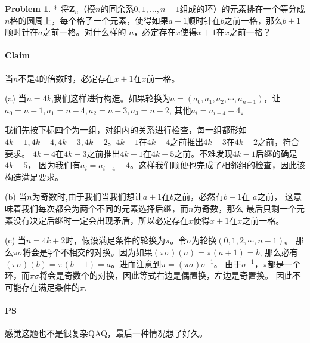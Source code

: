 \documentclass[UTF8]{ctexart}
\theoremstyle{definition}
\newtheorem{problem}{Problem}
\begin{document}
\begin{problem} *
将$\mathbf{Z}_n$（模$n$的同余系$0, 1, \dots, n-1$组成的环）的元素排在一个等分成$n$格的圆周上，每个格子一个元素，使得如果$a+1$顺时针在$b$之前一格，那么$b+1$顺时针在$a$之前一格。对什么样的
$n$，必定存在$x$使得$x+1$在$x$之前一格？

\paragraph{Claim} 当$n$不是4的倍数时，必定存在$x+1$在$x$前一格。

(a) 当$n=4k$,我们这样进行构造。如果轮换为$a=(a_0, a_1, a_2, \cdots, a_{n-1})$，让
$a_0=n-1, a_1 = n-4, a_2 = n-3, a_3=n-2$, 其他$a_i = a_{i-4} - 4$。

我们先按下标四个为一组，对组内的关系进行检查，每一组都形如
$4k-1,4k-4,4k-3,4k-2$。$4k-1$在$4k-4$之前推出$4k-3$在$4k-2$之前，符合要求。
$4k-4$在$4k-3$之前推出$4k-1$在$4k-5$之前。不难发现$4k-1$后继的确是$4k-5$，
因为我们有$a_i = a_{i-4} - 4$。这样我们顺便也完成了相邻组的检查，因此该构造满足要求。

(b) 当$n$为奇数时,由于我们当我们想让$a+1$在$b$之前，必然有$b+1$在
$a$之前， 这意味着我们每次都会为两个不同的元素选择后继，而$n$为奇数，那么
最后只剩一个元素没有决定后继时一定会出现矛盾，所以必定存在$x$使得$x+1$在$x$之前一格。

(c) 当$n=4k+2$时，假设满足条件的轮换为$\pi$。令$\sigma$为轮换$(0,1,2,\cdots,n-1)$。
那么$\pi\sigma$将会是$\frac n 2$个不相交的对换。因为如果$(\pi\sigma)(a)=\pi(a+1)=b$,
那么必有$(\pi\sigma)(b)=\pi(b+1)=a$。进而注意到$\pi = (\pi\sigma)\sigma^{-1}$。
由于$\sigma^{-1}，\pi$都是一个环，而$\pi\sigma$将会是奇数个的对换，因此等式右边是偶置换，左边是奇置换。
因此不可能存在满足条件的$\pi$.

\paragraph{PS} 感觉这题也不是很复杂QAQ，最后一种情况想了好久。



\end{problem}
\end{document}
